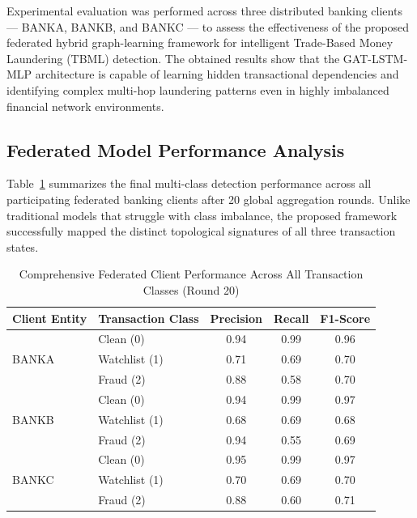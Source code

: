 \documentclass[conference]{IEEEtran}
\begin{document}
Experimental evaluation was performed across three distributed banking clients — BANKA, BANKB, and BANKC — to assess the effectiveness of the proposed federated hybrid graph-learning framework for intelligent Trade-Based Money Laundering (TBML) detection. The obtained results show that the GAT-LSTM-MLP architecture is capable of learning hidden transactional dependencies and identifying complex multi-hop laundering patterns even in highly imbalanced financial network environments.

\subsection{\textbf{Federated Model Performance Analysis}}

Table~\ref{tab:comprehensive_results} summarizes the final multi-class detection performance across all participating federated banking clients after 20 global aggregation rounds. Unlike traditional models that struggle with class imbalance, the proposed framework successfully mapped the distinct topological signatures of all three transaction states.

\begin{table}[t]
\centering
\caption{Comprehensive Federated Client Performance Across All Transaction Classes (Round 20)}
\label{tab:comprehensive_results}
\renewcommand{\arraystretch}{1.3}
\begin{tabular}{|l|l|c|c|c|}
\hline
\textbf{Client Entity} & \textbf{Transaction Class} & \textbf{Precision} & \textbf{Recall} & \textbf{F1-Score} \\
\hline
\hline
\multirow{3}{*}{BANKA} & Clean (0) & 0.94 & 0.99 & 0.96 \\
\cline{2-5}
 & Watchlist (1) & 0.71 & 0.69 & 0.70 \\
\cline{2-5}
 & Fraud (2) & 0.88 & 0.58 & 0.70 \\
\hline
\hline
\multirow{3}{*}{BANKB} & Clean (0) & 0.94 & 0.99 & 0.97 \\
\cline{2-5}
 & Watchlist (1) & 0.68 & 0.69 & 0.68 \\
\cline{2-5}
 & Fraud (2) & 0.94 & 0.55 & 0.69 \\
\hline
\hline
\multirow{3}{*}{BANKC} & Clean (0) & 0.95 & 0.99 & 0.97 \\
\cline{2-5}
 & Watchlist (1) & 0.70 & 0.69 & 0.70 \\
\cline{2-5}
 & Fraud (2) & 0.88 & 0.60 & 0.71 \\
\hline
\end{tabular}
\end{table}
\end{document}
